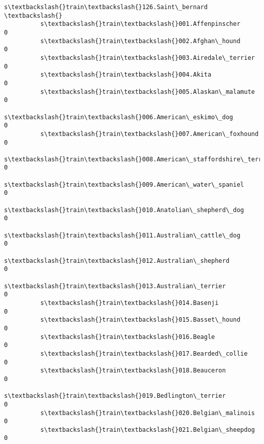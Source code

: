 \documentclass[11pt]{article}
\begin{document}
\begin{Verbatim}[commandchars=\\\{\}]
                                                          s\textbackslash{}train\textbackslash{}126.Saint\_bernard  \textbackslash{}
          s\textbackslash{}train\textbackslash{}001.Affenpinscher                                               0   
          s\textbackslash{}train\textbackslash{}002.Afghan\_hound                                                0   
          s\textbackslash{}train\textbackslash{}003.Airedale\_terrier                                            0   
          s\textbackslash{}train\textbackslash{}004.Akita                                                       0   
          s\textbackslash{}train\textbackslash{}005.Alaskan\_malamute                                            0   
          s\textbackslash{}train\textbackslash{}006.American\_eskimo\_dog                                         0   
          s\textbackslash{}train\textbackslash{}007.American\_foxhound                                           0   
          s\textbackslash{}train\textbackslash{}008.American\_staffordshire\_terrier                              0   
          s\textbackslash{}train\textbackslash{}009.American\_water\_spaniel                                      0   
          s\textbackslash{}train\textbackslash{}010.Anatolian\_shepherd\_dog                                      0   
          s\textbackslash{}train\textbackslash{}011.Australian\_cattle\_dog                                       0   
          s\textbackslash{}train\textbackslash{}012.Australian\_shepherd                                         0   
          s\textbackslash{}train\textbackslash{}013.Australian\_terrier                                          0   
          s\textbackslash{}train\textbackslash{}014.Basenji                                                     0   
          s\textbackslash{}train\textbackslash{}015.Basset\_hound                                                0   
          s\textbackslash{}train\textbackslash{}016.Beagle                                                      0   
          s\textbackslash{}train\textbackslash{}017.Bearded\_collie                                              0   
          s\textbackslash{}train\textbackslash{}018.Beauceron                                                   0   
          s\textbackslash{}train\textbackslash{}019.Bedlington\_terrier                                          0   
          s\textbackslash{}train\textbackslash{}020.Belgian\_malinois                                            0   
          s\textbackslash{}train\textbackslash{}021.Belgian\_sheepdog                                            0   

\end{Verbatim}
\end{document}
